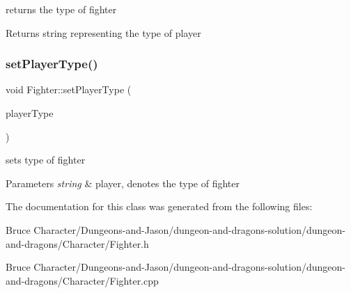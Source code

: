 returns the type of fighter \begin{DoxyReturn}{Returns}
string representing the type of player 
\end{DoxyReturn}
\hypertarget{class_fighter_a1435f9894dc4ffa11bfe13730b530ab6}{}\label{class_fighter_a1435f9894dc4ffa11bfe13730b530ab6} 
\subsubsection{\texorpdfstring{set\+Player\+Type()}{setPlayerType()}}
{\footnotesize\ttfamily void Fighter\+::set\+Player\+Type (\begin{DoxyParamCaption}\item[{string}]{player\+Type }\end{DoxyParamCaption})}

sets type of fighter 
\begin{DoxyParams}{Parameters}
{\em string} & player, denotes the type of fighter \\
\hline
\end{DoxyParams}


The documentation for this class was generated from the following files\+:\begin{DoxyCompactItemize}
\item 
Bruce Character/\+Dungeons-\/and-\/\+Jason/dungeon-\/and-\/dragons-\/solution/dungeon-\/and-\/dragons/\+Character/Fighter.\+h\item 
Bruce Character/\+Dungeons-\/and-\/\+Jason/dungeon-\/and-\/dragons-\/solution/dungeon-\/and-\/dragons/\+Character/Fighter.\+cpp\end{DoxyCompactItemize}
